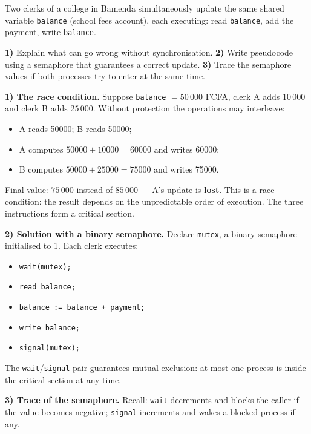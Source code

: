 \documentclass[11pt]{article}
\newcommand{\cle}[1]{{\popxbold\color{popdark}#1}}
\begin{document}
\begin{exoresolu}
Two clerks of a college in Bamenda simultaneously update the same shared variable \texttt{balance} (school fees account), each executing: read \texttt{balance}, add the payment, write \texttt{balance}.

\textbf{1)} Explain what can go wrong without synchronisation. \textbf{2)} Write pseudocode using a semaphore that guarantees a correct update. \textbf{3)} Trace the semaphore values if both processes try to enter at the same time.

\tcblower
\textbf{1) The race condition.} Suppose \texttt{balance} $= 50\,000$ FCFA, clerk A adds $10\,000$ and clerk B adds $25\,000$. Without protection the operations may interleave:
\begin{itemize}
\item A reads 50000; B reads 50000;
\item A computes $50000 + 10000 = 60000$ and writes 60000;
\item B computes $50000 + 25000 = 75000$ and writes 75000.
\end{itemize}
Final value: $75\,000$ instead of $85\,000$ — A's update is \textbf{lost}. This is a \cle{race condition}: the result depends on the unpredictable order of execution. The three instructions form a \cle{critical section}.

\textbf{2) Solution with a binary semaphore.} Declare \texttt{mutex}, a binary semaphore initialised to 1. Each clerk executes:

\begin{itemize}
\item[] \texttt{wait(mutex);}
\item[] \texttt{read balance;}
\item[] \texttt{balance := balance + payment;}
\item[] \texttt{write balance;}
\item[] \texttt{signal(mutex);}
\end{itemize}

The \texttt{wait}/\texttt{signal} pair guarantees \cle{mutual exclusion}: at most one process is inside the critical section at any time.

\textbf{3) Trace of the semaphore.} Recall: \texttt{wait} decrements and blocks the caller if the value becomes negative; \texttt{signal} increments and wakes a blocked process if any.


\end{exoresolu}
\end{document}
